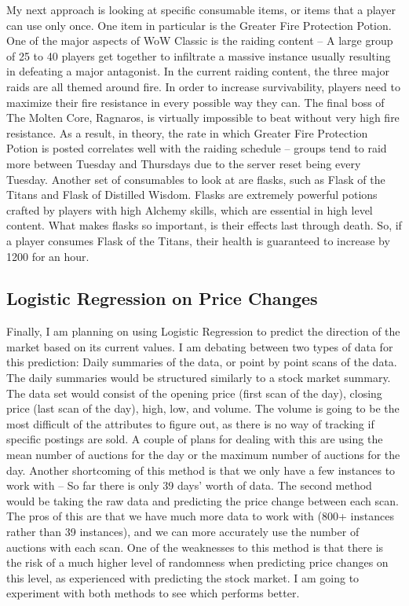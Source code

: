 \documentclass[sigconf]{acmart}
\begin{document}
	My next approach is looking at specific consumable items, or items that a player can use only once. One item in particular is the Greater Fire Protection Potion. One of the major aspects of WoW Classic is the raiding content – A large group of 25 to 40 players get together to infiltrate a massive instance usually resulting in defeating a major antagonist. In the current raiding content, the three major raids are all themed around fire. In order to increase survivability, players need to maximize their fire resistance in every possible way they can. The final boss of The Molten Core, Ragnaros, is virtually impossible to beat without very high fire resistance. As a result, in theory, the rate in which Greater Fire Protection Potion is posted correlates well with the raiding schedule – groups tend to raid more between Tuesday and Thursdays due to the server reset being every Tuesday. Another set of consumables to look at are flasks, such as Flask of the Titans and Flask of Distilled Wisdom. Flasks are extremely powerful potions crafted by players with high Alchemy skills, which are essential in high level content. What makes flasks so important, is their effects last through death. So, if a player consumes Flask of the Titans, their health is guaranteed to increase by 1200 for an hour.

\subsection{Logistic Regression on Price Changes}

Finally, I am planning on using Logistic Regression to predict the direction of the market based on its current values. I am debating between two types of data for this prediction: Daily summaries of the data, or point by point scans of the data. The daily summaries would be structured similarly to a stock market summary. The data set would consist of the opening price (first scan of the day), closing price (last scan of the day), high, low, and volume. The volume is going to be the most difficult of the attributes to figure out, as there is no way of tracking if specific postings are sold. A couple of plans for dealing with this are using the mean number of auctions for the day or the maximum number of auctions for the day. Another shortcoming of this method is that we only have a few instances to work with – So far there is only 39 days’ worth of data. The second method would be taking the raw data and predicting the price change between each scan. The pros of this are that we have much more data to work with (800+ instances rather than 39 instances), and we can more accurately use the number of auctions with each scan. One of the weaknesses to this method is that there is the risk of a much higher level of randomness when predicting price changes on this level, as experienced with predicting the stock market. I am going to experiment with both methods to see which performs better.
\end{document}
